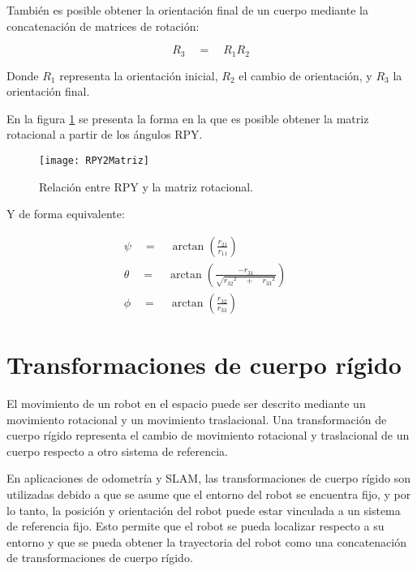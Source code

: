  
 También es posible obtener la orientación final de un cuerpo mediante la concatenación de matrices de rotación:
 
 
  \begin{equation}
 { R }_{ 3 }\quad =\quad { R }_{ 1 }{ R }_{ 2 }
 \label{eq:Propiedad4MatrizRotacion}
 \end{equation}
 
 Donde ${ R }_{ 1 }$ representa la orientación inicial, ${ R }_{ 2 }$ el cambio de orientación, y ${ R }_{ 3 }$ la orientación final.
 
 En la figura \ref{imagen:rpy2matriz} se presenta la forma en la que es posible obtener la matriz rotacional a partir de los ángulos RPY.
 
 \begin{figure}[H]
 	\centering
 	\texttt{[image: RPY2Matriz]}
 	\caption[Relación entre RPY y la matriz rotacional]{Relación entre RPY y la matriz rotacional. }
 	\label{imagen:rpy2matriz}
 \end{figure} 
 
 Y de forma equivalente:
 

\begin{align}
 \psi \quad =\quad \arctan { (\frac { { r }_{ 21 } }{ { r }_{ 11 } }) } 
 \\ \theta \quad =\quad \arctan { (\frac { -{ r }_{ 31 } }{ \sqrt { { { r }_{ 32 } }^{ 2 }\quad +\quad { { r }_{ 33 } }^{ 2 } }  } ) } \quad 
 \\ \phi \quad =\quad \arctan { (\frac { { r }_{ 32 } }{ { r }_{ 33 } } ) } \quad 
 \label{eq:Matriz2RPY}
 \end{align}

\section{ Transformaciones de cuerpo rígido }

El movimiento de un robot en el espacio puede ser descrito mediante un movimiento rotacional y un movimiento traslacional. Una transformación de cuerpo rígido representa el cambio de movimiento rotacional y traslacional de un cuerpo respecto a otro sistema de referencia.

En aplicaciones de odometría y SLAM, las transformaciones de cuerpo rígido son utilizadas debido a que se asume que el entorno del robot se encuentra fijo, y por lo tanto, la posición y orientación del robot puede estar vinculada a un sistema de referencia fijo. Esto permite que el robot se pueda localizar respecto a su entorno y que se pueda obtener la trayectoria del robot como una concatenación de transformaciones de cuerpo rígido.

